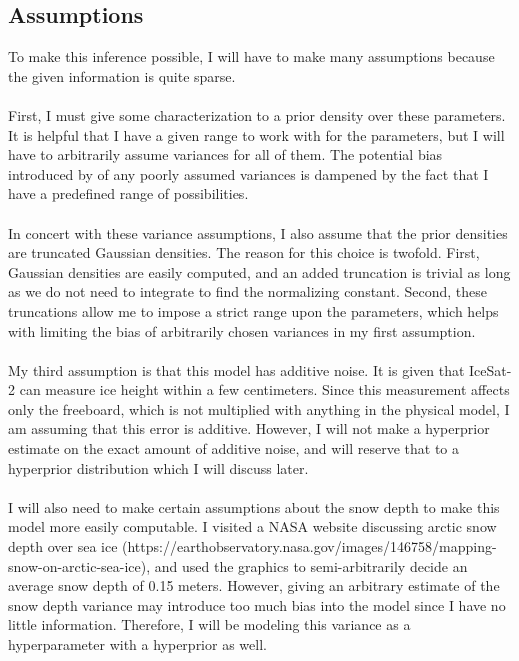\documentclass[12pt, letterpaper]{article}
\begin{document}
\subsection{Assumptions}
To make this inference possible, I will have to make many assumptions because the given information is quite sparse.
\\\\
First, I must give some characterization to a prior density over these parameters. It is helpful that I have a given
range to work with for the parameters, but I will have to arbitrarily assume variances for all of them.
The potential bias introduced by of any poorly assumed variances is dampened by the fact that I have a predefined range of possibilities.
\\\\
In concert with these variance assumptions, I also assume that the prior densities are truncated Gaussian densities.
The reason for this choice is twofold. First, Gaussian densities are easily computed, and an added truncation is trivial
as long as we do not need to integrate to find the normalizing constant. Second, these truncations allow me to impose a strict
range upon the parameters, which helps with limiting the bias of arbitrarily chosen variances in my first assumption.
\\\\
My third assumption is that this model has additive noise. It is given that IceSat-2 can measure ice height within a few centimeters.
Since this measurement affects only the freeboard, which is not multiplied with anything in the physical model, I am assuming that this error
is additive. However, I will not make a hyperprior estimate on the exact amount of additive noise, and will reserve that to a hyperprior distribution
which I will discuss later.
\\\\
I will also need to make certain assumptions about the snow depth to make this model more easily computable. I visited a NASA website
discussing arctic snow depth over sea ice (https://earthobservatory.nasa.gov/images/146758/mapping-snow-on-arctic-sea-ice), and used the graphics
to semi-arbitrarily decide an average snow depth of 0.15 meters. However, giving an arbitrary estimate of the snow depth variance may
introduce too much bias into the model since I have no little information. Therefore, I will be modeling this variance as a hyperparameter
with a hyperprior as well.
\\\\
\end{document}
